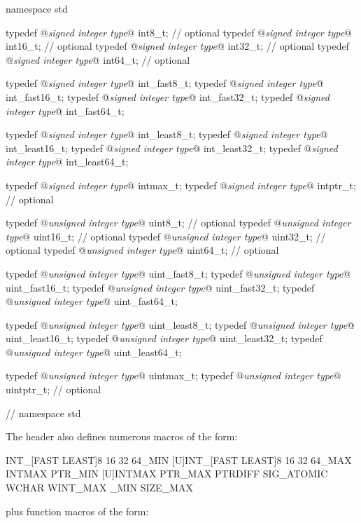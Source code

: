 \begin{codeblock}
namespace std {
  typedef @\textit{signed integer type}@ int8_t;   // optional
  typedef @\textit{signed integer type}@ int16_t;  // optional
  typedef @\textit{signed integer type}@ int32_t;  // optional
  typedef @\textit{signed integer type}@ int64_t;  // optional

  typedef @\textit{signed integer type}@ int_fast8_t;
  typedef @\textit{signed integer type}@ int_fast16_t;
  typedef @\textit{signed integer type}@ int_fast32_t;
  typedef @\textit{signed integer type}@ int_fast64_t;

  typedef @\textit{signed integer type}@ int_least8_t;
  typedef @\textit{signed integer type}@ int_least16_t;
  typedef @\textit{signed integer type}@ int_least32_t;
  typedef @\textit{signed integer type}@ int_least64_t;

  typedef @\textit{signed integer type}@ intmax_t;
  typedef @\textit{signed integer type}@ intptr_t;         // optional

  typedef @\textit{unsigned integer type}@ uint8_t;        // optional
  typedef @\textit{unsigned integer type}@ uint16_t;       // optional
  typedef @\textit{unsigned integer type}@ uint32_t;       // optional
  typedef @\textit{unsigned integer type}@ uint64_t;       // optional

  typedef @\textit{unsigned integer type}@ uint_fast8_t;
  typedef @\textit{unsigned integer type}@ uint_fast16_t;
  typedef @\textit{unsigned integer type}@ uint_fast32_t;
  typedef @\textit{unsigned integer type}@ uint_fast64_t;

  typedef @\textit{unsigned integer type}@ uint_least8_t;
  typedef @\textit{unsigned integer type}@ uint_least16_t;
  typedef @\textit{unsigned integer type}@ uint_least32_t;
  typedef @\textit{unsigned integer type}@ uint_least64_t;

  typedef @\textit{unsigned integer type}@ uintmax_t;
  typedef @\textit{unsigned integer type}@ uintptr_t;      // optional
} // namespace std
\end{codeblock}

\pnum
The header also defines numerous macros of the form:

\begin{codeblock}
  INT_[FAST LEAST]{8 16 32 64}_MIN
  [U]INT_[FAST LEAST]{8 16 32 64}_MAX
  INT{MAX PTR}_MIN
  [U]INT{MAX PTR}_MAX
  {PTRDIFF SIG_ATOMIC WCHAR WINT}{_MAX _MIN}
  SIZE_MAX
\end{codeblock}

plus function macros of the form:

